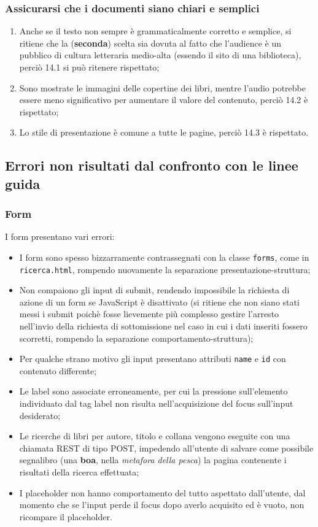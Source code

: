 \subsubsection{Assicurarsi che i documenti siano chiari e semplici}
\begin{enumerate}
\item Anche se il testo non sempre è grammaticalmente corretto e semplice, si
ritiene che la (\textbf{seconda}) scelta sia dovuta al fatto che l'audience è
un pubblico di cultura letteraria medio-alta (essendo il sito di una
biblioteca), perciò 14.1 si può ritenere rispettato;
\item Sono mostrate le immagini delle copertine dei libri, mentre l'audio
potrebbe essere meno significativo per aumentare il valore del contenuto,
perciò 14.2 è rispettato;
\item Lo stile di presentazione è comune a tutte le pagine, perciò 14.3 è
rispettato.
\end{enumerate}


\subsection{Errori non risultati dal confronto con le linee guida}

\subsubsection{Form}\label{sec:acc-form}
I form presentano vari errori:
\begin{itemize}
\item I form sono spesso bizzarramente contrassegnati con la classe
\texttt{forms}, come in \texttt{ricerca.html}, rompendo nuovamente la
separazione presentazione-struttura;
\item Non compaiono gli input di submit, rendendo impossibile la richiesta di
azione di un form se JavaScript è disattivato (si ritiene che non siano stati
messi i submit poichè fosse lievemente più complesso gestire l'arresto
nell'invio della richiesta di sottomissione nel caso in cui i dati inseriti
fossero scorretti, rompendo la separazione comportamento-struttura);
\item Per qualche strano motivo gli input presentano attributi \texttt{name} e
\texttt{id} con contenuto differente;
\item Le label sono associate erroneamente, per cui la pressione sull'elemento
individuato dal tag label non risulta nell'acquisizione del focus sull'input
desiderato;
\item Le ricerche di libri per autore, titolo e collana vengono eseguite con
una chiamata REST di tipo POST, impedendo all'utente di salvare come possibile
segnalibro (una \textbf{boa}, nella \textit{metafora della pesca}) la pagina
contenente i risultati della ricerca effettuata;
\item I placeholder non hanno comportamento del tutto aspettato dall'utente,
dal momento che se l'input perde il focus dopo averlo acquisito ed è vuoto,
non ricompare il placeholder.
\end{itemize}

